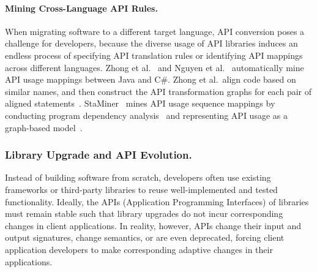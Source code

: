 \paragraph{{Mining Cross-Language API Rules.}}
When migrating software to a different target language, API conversion poses a challenge for developers, because the diverse usage of API libraries induces an endless process of specifying API translation rules or identifying API mappings across different languages. Zhong et al.~\cite{zhong2010mining} and Nguyen et al.~\cite{nguyen2014statistical,Nguyen:2017:EAE} automatically mine API usage mappings between Java and C\#. Zhong et al.~align code based on similar names, and then construct the API transformation graphs for each pair of aligned statements~\cite{zhong2010mining}. StaMiner~\cite{nguyen2014statistical} mines API usage sequence mappings by conducting program dependency analysis~\cite{Muchnick:1998} and representing API usage as a graph-based model~\cite{Nguyen09}. %

\subsubsection{Library Upgrade and API Evolution.}
Instead of building software from scratch, developers often use existing frameworks or third-party libraries to reuse well-implemented and tested functionality. Ideally, the APIs (Application Programming Interfaces) of libraries must remain stable such that library upgrades do not incur corresponding changes in client applications. In reality, however, APIs change their input and output signatures, change semantics, or are even deprecated, forcing client application developers to make corresponding adaptive changes in their applications.  

